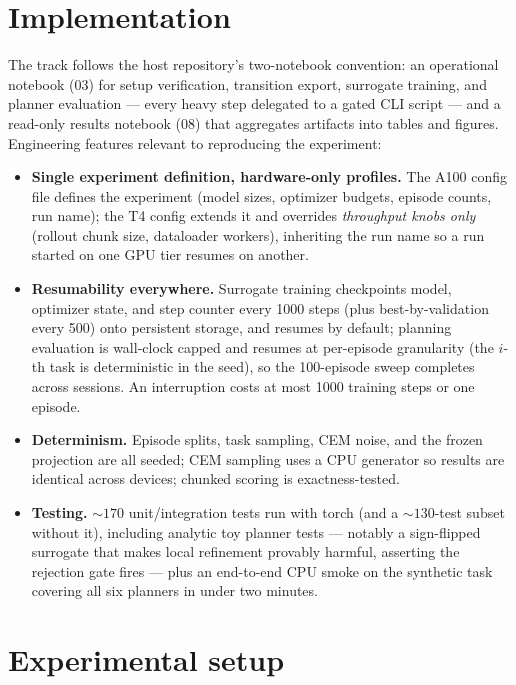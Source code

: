 \documentclass[11pt,a4paper]{article}
\begin{document}
\section{Implementation}
\label{sec:implementation}

The track follows the host repository's two-notebook convention: an
operational notebook (03) for setup verification, transition export,
surrogate training, and planner evaluation --- every heavy step delegated to a
gated CLI script --- and a read-only results notebook (08) that aggregates
artifacts into tables and figures. Engineering features relevant to
reproducing the experiment:

\begin{itemize}[leftmargin=1.4em]
  \item \textbf{Single experiment definition, hardware-only profiles.} The
        A100 config file defines the experiment (model sizes, optimizer
        budgets, episode counts, run name); the T4 config extends it and
        overrides \emph{throughput knobs only} (rollout chunk size, dataloader
        workers), inheriting the run name so a run started on one GPU tier
        resumes on another.
  \item \textbf{Resumability everywhere.} Surrogate training checkpoints
        model, optimizer state, and step counter every 1000 steps (plus
        best-by-validation every 500) onto persistent storage, and resumes by
        default; planning evaluation is wall-clock capped and resumes at
        per-episode granularity (the $i$-th task is deterministic in the
        seed), so the 100-episode sweep completes across sessions.
        An interruption costs at most 1000 training steps or one episode.
  \item \textbf{Determinism.} Episode splits, task sampling, CEM noise, and
        the frozen projection are all seeded; CEM sampling uses a CPU
        generator so results are identical across devices; chunked scoring is
        exactness-tested.
  \item \textbf{Testing.} ${\sim}170$ unit/integration tests run with torch
        (and a ${\sim}130$-test subset without it), including analytic toy
        planner tests --- notably a sign-flipped surrogate that makes local
        refinement provably harmful, asserting the rejection gate fires ---
        plus an end-to-end CPU smoke on the synthetic task covering all six
        planners in under two minutes.
\end{itemize}

\section{Experimental setup}
\label{sec:setup}
\end{document}
